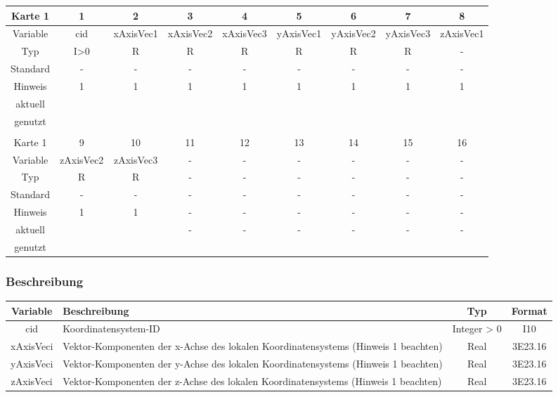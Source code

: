 \documentclass[11pt,titlepage,listof=totoc,bibliography=totoc,twoside]{scrreprt}
\begin{document}
{{\begin{table}[htbp]
\centering
\begin{tabularx}{\textwidth}{cCCCCCCCC}
\toprule
Karte 1	& 1		& 2		& 3		& 4		& 5		& 6		& 7		& 8		\\
\midrule
Variable& cid		& xAxisVec1	& xAxisVec2	& xAxisVec3	& yAxisVec1	& yAxisVec2	& yAxisVec3	& zAxisVec1	\\
Typ	& I>0		& R		& R		& R		& R		& R		& R		& -		\\
Standard& -		& -		& -		& -		& -		& -		& -		& -		\\
Hinweis	& 1		& 1		& 1		& 1		& 1		& 1		& 1		& 1		\\
aktuell	& 	& 	& 	& 	& 	& 	& 	& 	\\
genutzt \\
\\
Karte 1	& 9		& 10		& 11		& 12		& 13		& 14		& 15		& 16		\\
\midrule
Variable& zAxisVec2	& zAxisVec3	& -		& -		& -		& -		& -		& -		\\
Typ	& R		& R		& -		& -		& -		& -		& -		& -		\\
Standard& -		& -		& -		& -		& -		& -		& -		& -		\\
Hinweis	& 1		& 1		& -		& -		& -		& -		& -		& -		\\
aktuell	& 	& 	& 	& 	& 	& \multirow{2}{*}{-}	& 	& 	\\
genutzt \\
\bottomrule
\end{tabularx}
\end{table}

\subsubsection{Beschreibung}

\begin{tabularx}{\textwidth}{cXcc}
\toprule
Variable	& Beschreibung								& Typ		& Format	\\
\midrule
cid		& Koordinatensystem-ID							& Integer > 0	& I10		\\
xAxisVeci	& Vektor-Komponenten der x-Achse des lokalen Koordinatensystems (Hinweis 1 beachten)	& Real		& 3E23.16	\\
yAxisVeci	& Vektor-Komponenten der y-Achse des lokalen Koordinatensystems (Hinweis 1 beachten)	& Real		& 3E23.16	\\
zAxisVeci	& Vektor-Komponenten der z-Achse des lokalen Koordinatensystems (Hinweis 1 beachten)	& Real		& 3E23.16	\\
\bottomrule
\end{tabularx}

}}
\end{document}
